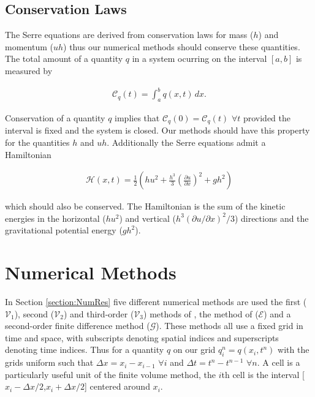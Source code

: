 \documentclass[times]{elsarticle}
\begin{document}
\subsection{Conservation Laws}
The Serre equations are derived from conservation laws for mass ($h$) and momentum ($uh$) \cite{Su-Gardener-1969-536} thus our numerical methods should conserve these quantities. The total amount of a quantity $q$ in a system ocurring on the interval $[a,b]$ is measured by
\begin{linenomath*}
\begin{gather*}
\label{eqn:Condef}
\mathcal{C}_q(t) = \int_{a}^{b} q(x,t)\, dx .
\end{gather*}
\end{linenomath*}
Conservation of a quantity $q$ implies that $\mathcal{C}_{q}(0) = \mathcal{C}_{q}(t)$ $\forall t$ provided the interval is fixed and the system is closed. Our methods should have this property for the quantities $h$ and $uh$. Additionally the Serre equations admit a Hamiltonian \cite{Li-Y-2002,Green-Naghdi-1976-237}
\begin{linenomath*}
\begin{gather}
\label{eqn:Hamildef}
\mathcal{H}(x,t) = \frac{1}{2} \left(hu^2 + \frac{h^3}{3} \left(\frac{\partial u}{\partial x}\right)^2 + gh^2\right)
\end{gather}
\end{linenomath*}
which should also be conserved. The Hamiltonian is the sum of the kinetic energies in the horizontal ($hu^2$) and vertical (${h^3} \left({\partial u}/{\partial x}\right)^2 /{3}$) directions and the gravitational potential energy ($gh^2$).  

\section{Numerical Methods}
In Section \ref{section:NumRes} five different numerical methods are used the first ($\mathcal{V}_1$), second ($\mathcal{V}_2$) and third-order ($\mathcal{V}_3$) methods of \cite{Zoppou-etal-2017}, the method of \citet{El-etal-2006} ($\mathcal{E}$) and a second-order finite difference method ($\mathcal{G}$). These methods all use a fixed grid in time and space, with subscripts denoting spatial indices and superscripts denoting time indices. Thus for a quantity $q$ on our grid $q_i^n = q(x_i,t^n)$ with the grids uniform such that $\Delta x = x_{i} - x_{i-1}$ $\forall i$ and $\Delta t = t^{n} - t^{n-1}$ $\forall n$. A cell is a particularly useful unit of the finite volume method, the $i$th cell is the interval [$x_i -\Delta x/2$,$x_i +\Delta x/2$] centered around $x_{i}$.
\end{document}
